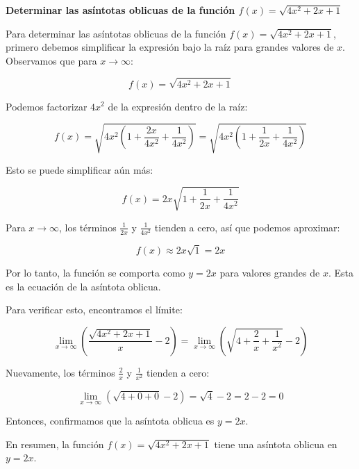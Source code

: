 \documentclass[answers]{exam} %
\begin{document}
\begin{questions}
    \vspace{0.5cm}
    \question \large\textbf{Determinar las asíntotas oblicuas de la función \(f(x)=\sqrt{4x^2+2x+1}\)}
    \begin{solution}
        Para determinar las asíntotas oblicuas de la función \( f(x) = \sqrt{4x^2 + 2x + 1} \), primero debemos simplificar la expresión bajo la raíz para grandes valores de \( x \). Observamos que para \( x \to \infty \):
    
        \[
        f(x) = \sqrt{4x^2 + 2x + 1}
        \]
    
        Podemos factorizar \( 4x^2 \) de la expresión dentro de la raíz:
    
        \[
        f(x) = \sqrt{4x^2 \left( 1 + \frac{2x}{4x^2} + \frac{1}{4x^2} \right)} = \sqrt{4x^2 \left( 1 + \frac{1}{2x} + \frac{1}{4x^2} \right)}
        \]
    
        Esto se puede simplificar aún más:
    
        \[
        f(x) = 2x \sqrt{1 + \frac{1}{2x} + \frac{1}{4x^2}}
        \]
    
        Para \( x \to \infty \), los términos \(\frac{1}{2x}\) y \(\frac{1}{4x^2}\) tienden a cero, así que podemos aproximar:
    
        \[
        f(x) \approx 2x \sqrt{1} = 2x
        \]
    
        Por lo tanto, la función se comporta como \( y = 2x \) para valores grandes de \( x \). Esta es la ecuación de la asíntota oblicua.
    
        Para verificar esto, encontramos el límite:
    
        \[
        \lim_{x \to \infty} \left( \frac{\sqrt{4x^2 + 2x + 1}}{x} - 2 \right) = \lim_{x \to \infty} \left( \sqrt{4 + \frac{2}{x} + \frac{1}{x^2}} - 2 \right)
        \]
    
        Nuevamente, los términos \(\frac{2}{x}\) y \(\frac{1}{x^2}\) tienden a cero:
    
        \[
        \lim_{x \to \infty} \left( \sqrt{4 + 0 + 0} - 2 \right) = \sqrt{4} - 2 = 2 - 2 = 0
        \]
    
        Entonces, confirmamos que la asíntota oblicua es \( y = 2x \).
    
        En resumen, la función \( f(x) = \sqrt{4x^2 + 2x + 1} \) tiene una asíntota oblicua en \( y = 2x \).
    \end{solution}
    

    \vspace{0.5cm}

    
\end{questions}
\end{document}
